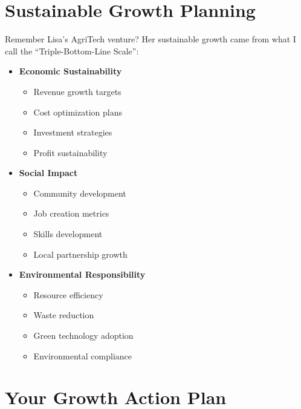 \section{Sustainable Growth Planning}\label{sec:sustainable-growth}

Remember Lisa's AgriTech venture? Her sustainable growth came from what I call the ``Triple-Bottom-Line Scale'':

\begin{tcolorbox}[colback=white,colframe=primarydark,title=\textbf{Sustainable Scaling Components}]
\begin{itemize}
    \item \textbf{Economic Sustainability}
    \begin{itemize}
        \item Revenue growth targets
        \item Cost optimization plans
        \item Investment strategies
        \item Profit sustainability
    \end{itemize}

    \item \textbf{Social Impact}
    \begin{itemize}
        \item Community development
        \item Job creation metrics
        \item Skills development
        \item Local partnership growth
    \end{itemize}

    \item \textbf{Environmental Responsibility}
    \begin{itemize}
        \item Resource efficiency
        \item Waste reduction
        \item Green technology adoption
        \item Environmental compliance
    \end{itemize}
\end{itemize}
\end{tcolorbox}

\section{Your Growth Action Plan}\label{sec:growth-action-plan}


